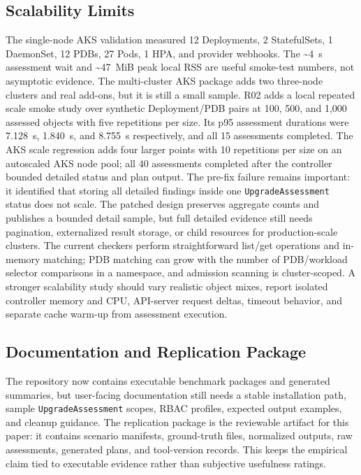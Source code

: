 \documentclass[10pt,journal]{IEEEtran}
\newcommand{\crd}[1]{\texttt{#1}}
\begin{document}
\subsection{Scalability Limits}
The single-node AKS validation measured 12 Deployments, 2 StatefulSets, 1 DaemonSet, 12 PDBs, 27 Pods, 1 HPA, and provider webhooks. The \~{}4~s assessment wait and \~{}47~MiB peak local RSS are useful smoke-test numbers, not asymptotic evidence. The multi-cluster AKS package adds two three-node clusters and real add-ons, but it is still a small sample. R02 adds a local repeated scale smoke study over synthetic Deployment/PDB pairs at 100, 500, and 1,000 assessed objects with five repetitions per size. Its p95 assessment durations were 7.128~s, 1.840~s, and 8.755~s respectively, and all 15 assessments completed. The AKS scale regression adds four larger points with 10 repetitions per size on an autoscaled AKS node pool; all 40 assessments completed after the controller bounded detailed status and plan output. The pre-fix failure remains important: it identified that storing all detailed findings inside one \crd{UpgradeAssessment} status does not scale. The patched design preserves aggregate counts and publishes a bounded detail sample, but full detailed evidence still needs pagination, externalized result storage, or child resources for production-scale clusters. The current checkers perform straightforward list/get operations and in-memory matching; PDB matching can grow with the number of PDB/workload selector comparisons in a namespace, and admission scanning is cluster-scoped. A stronger scalability study should vary realistic object mixes, report isolated controller memory and CPU, API-server request deltas, timeout behavior, and separate cache warm-up from assessment execution.

\subsection{Documentation and Replication Package}
The repository now contains executable benchmark packages and generated summaries, but user-facing documentation still needs a stable installation path, sample \crd{UpgradeAssessment} scopes, RBAC profiles, expected output examples, and cleanup guidance. The replication package is the reviewable artifact for this paper: it contains scenario manifests, ground-truth files, normalized outputs, raw assessments, generated plans, and tool-version records. This keeps the empirical claim tied to executable evidence rather than subjective usefulness ratings.
\end{document}
